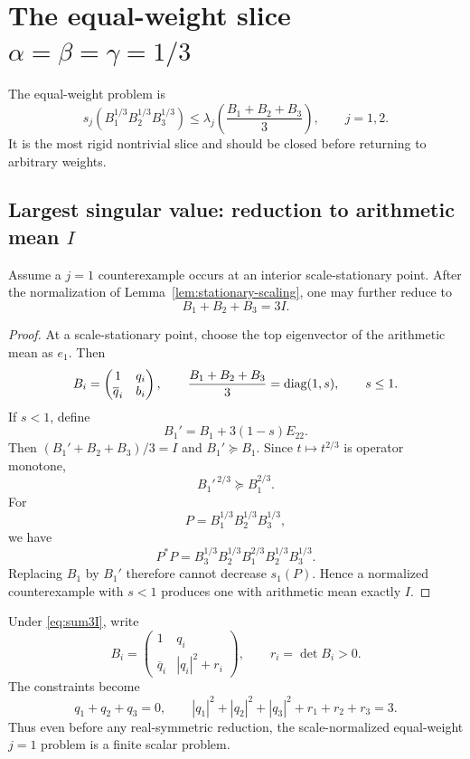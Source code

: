 \section{The equal-weight slice $\alpha=\beta=\gamma=1/3$}

The equal-weight problem is
\begin{equation}
 s_j(B_1^{1/3}B_2^{1/3}B_3^{1/3})
 \le
 \lambda_j\!\left(\frac{B_1+B_2+B_3}{3}\right),
 \qquad j=1,2.
 \label{eq:equal-weight}
\end{equation}
It is the most rigid nontrivial slice and should be closed before returning to arbitrary weights.

\subsection{Largest singular value: reduction to arithmetic mean $I$}
\begin{proposition}[Equal-weight $j=1$ normalization \statusR]
Assume a $j=1$ counterexample occurs at an interior scale-stationary point.  After the normalization of Lemma~\ref{lem:stationary-scaling}, one may further reduce to
\begin{equation}
\boxed{B_1+B_2+B_3=3I.}
\label{eq:sum3I}
\end{equation}
\end{proposition}
\begin{proof}
At a scale-stationary point, choose the top eigenvector of the arithmetic mean as $e_1$.  Then
\[
B_i=\begin{pmatrix}1&q_i\\ \overline q_i&b_i\end{pmatrix},
\qquad
\frac{B_1+B_2+B_3}{3}=\operatorname{diag}(1,s),
\qquad s\le1.
\]
If $s<1$, define
\[
B_1'=B_1+3(1-s)E_{22}.
\]
Then $(B_1'+B_2+B_3)/3=I$ and $B_1'\succeq B_1$.  Since $t\mapsto t^{2/3}$ is operator monotone,
\[
B_1'^{\,2/3}\succeq B_1^{2/3}.
\]
For
\[
P=B_1^{1/3}B_2^{1/3}B_3^{1/3},
\]
we have
\[
P^*P=B_3^{1/3}B_2^{1/3}B_1^{2/3}B_2^{1/3}B_3^{1/3}.
\]
Replacing $B_1$ by $B_1'$ therefore cannot decrease $s_1(P)$.  Hence a normalized counterexample with $s<1$ produces one with arithmetic mean exactly $I$.
\end{proof}

Under \eqref{eq:sum3I}, write
\[
B_i=\begin{pmatrix}1&q_i\\ \overline q_i&|q_i|^2+r_i\end{pmatrix},
\qquad r_i=\det B_i>0.
\]
The constraints become
\begin{equation}
q_1+q_2+q_3=0,
\qquad
|q_1|^2+|q_2|^2+|q_3|^2+r_1+r_2+r_3=3.
\label{eq:equal-j1-constraints}
\end{equation}
Thus even before any real-symmetric reduction, the scale-normalized equal-weight $j=1$ problem is a finite scalar problem.

